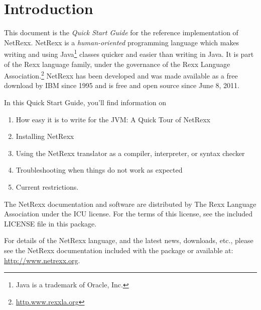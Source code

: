 \chapter{Introduction}
This document is the \emph{Quick Start Guide} for the reference implementation of
NetRexx. NetRexx is a \emph{human-oriented} programming language which makes
writing and using Java\footnote{Java is a trademark of Oracle, Inc.}
classes quicker and easier than writing in Java. It is part of the Rexx
language family, under the governance of the Rexx Language
Association.\footnote{\url{http.www.rexxla.org}} NetRexx has been
developed and was made available as a free download by IBM since 1995
and is free and open source since June 8, 2011.

In this Quick Start Guide, you’ll find information on
\begin{enumerate} 
\item How easy it is to write for the JVM: A Quick Tour of NetRexx
\item Installing NetRexx 
\item Using the NetRexx translator as a compiler, interpreter, or
  syntax checker 
\item Troubleshooting when things do not work as expected
\item Current restrictions.
\end{enumerate} 
The NetRexx documentation and software are distributed
by The Rexx Language Association under the \textsc{ICU} license. For
the terms of this license, see the included \textsc{LICENSE} file in
this package.

For details of the NetRexx language, and the latest news, downloads,
etc., please see the NetRexx documentation included with the package
or available at: \url{http://www.netrexx.org}.

